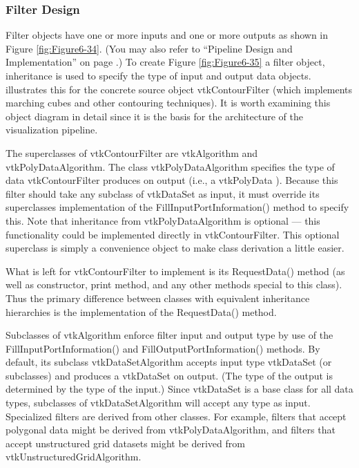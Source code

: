 \subsubsection{Filter Design}

Filter objects have one or more inputs and one or more outputs as shown in Figure \ref{fig:Figure6-34}. (You may also refer to ``Pipeline Design and Implementation'' on page \pageref{subsec:pipeline_design_implemnentaion}.) To create Figure \ref{fig:Figure6-35} a filter object, inheritance is used to specify the type of input and output data objects. illustrates this for the concrete source object vtkContourFilter (which implements marching cubes and other contouring techniques). It is worth examining this object diagram in detail since it is the basis for the architecture of the visualization pipeline.

The superclasses of vtkContourFilter are vtkAlgorithm and vtkPolyDataAlgorithm. The class vtkPolyDataAlgorithm specifies the type of data vtkContourFilter produces on output (i.e., a vtkPolyData ). Because this filter should take any subclass of vtkDataSet as input, it must override its superclasses implementation of the FillInputPortInformation() method to specify this. Note that inheritance from vtkPolyDataAlgorithm is optional --- this functionality could be implemented directly in vtkContourFilter. This optional superclass is simply a convenience object to make class derivation a little easier.

What is left for vtkContourFilter to implement is its RequestData() method (as well as constructor, print method, and any other methods special to this class). Thus the primary difference between classes with equivalent inheritance hierarchies is the implementation of the RequestData() method.

Subclasses of vtkAlgorithm enforce filter input and output type by use of the FillInputPortInformation() and FillOutputPortInformation() methods. By default, its subclass vtkDataSetAlgorithm accepts input type vtkDataSet (or subclasses) and produces a vtkDataSet on output. (The type of the output is determined by the type of the input.) Since vtkDataSet is a base class for all data types, subclasses of vtkDataSetAlgorithm will accept any type as input. Specialized filters are derived from other classes. For example, filters that accept polygonal data might be derived from vtkPolyDataAlgorithm, and filters that accept unstructured grid datasets might be derived from vtkUnstructuredGridAlgorithm.

